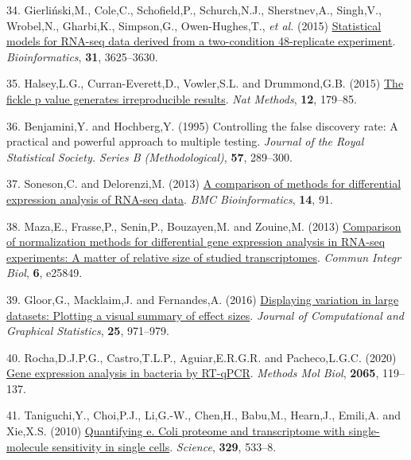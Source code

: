 \documentclass[
]{article}
\newlength{\cslhangindent}
\newenvironment{CSLReferences}[2] %
 {\begin{list}{}{%
  \setlength{\itemindent}{0pt}
  \setlength{\leftmargin}{0pt}
  \setlength{\parsep}{0pt}
  \ifodd #1
   \setlength{\leftmargin}{\cslhangindent}
   \setlength{\itemindent}{-1\cslhangindent}
  \fi
  \setlength{\itemsep}{#2\baselineskip}}}
 {\end{list}}
\begin{document}
\begin{CSLReferences}{1}{1}
34. Gierliński,M., Cole,C., Schofield,P., Schurch,N.J., Sherstnev,A.,
Singh,V., Wrobel,N., Gharbi,K., Simpson,G., Owen-Hughes,T., \emph{et
al.} (2015)
\href{https://doi.org/10.1093/bioinformatics/btv425}{Statistical models
for RNA-seq data derived from a two-condition 48-replicate experiment}.
\emph{Bioinformatics}, \textbf{31}, 3625--3630.

35. Halsey,L.G., Curran-Everett,D., Vowler,S.L. and Drummond,G.B. (2015)
\href{https://doi.org/10.1038/nmeth.3288}{The fickle p value generates
irreproducible results}. \emph{Nat Methods}, \textbf{12}, 179--85.

36. Benjamini,Y. and Hochberg,Y. (1995) Controlling the false discovery
rate: A practical and powerful approach to multiple testing.
\emph{Journal of the Royal Statistical Society. Series B
(Methodological)}, \textbf{57}, 289--300.

37. Soneson,C. and Delorenzi,M. (2013)
\href{https://doi.org/10.1186/1471-2105-14-91}{A comparison of methods
for differential expression analysis of {RNA-seq} data}. \emph{BMC
Bioinformatics}, \textbf{14}, 91.

38. Maza,E., Frasse,P., Senin,P., Bouzayen,M. and Zouine,M. (2013)
\href{https://doi.org/10.4161/cib.25849}{Comparison of normalization
methods for differential gene expression analysis in RNA-seq
experiments: A matter of relative size of studied transcriptomes}.
\emph{Commun Integr Biol}, \textbf{6}, e25849.

39. Gloor,G., Macklaim,J. and Fernandes,A. (2016)
\href{https://doi.org/10.1080/10618600.2015.1131161}{Displaying
variation in large datasets: Plotting a visual summary of effect sizes}.
\emph{Journal of Computational and Graphical Statistics}, \textbf{25},
971--979.

40. Rocha,D.J.P.G., Castro,T.L.P., Aguiar,E.R.G.R. and Pacheco,L.G.C.
(2020) \href{https://doi.org/10.1007/978-1-4939-9833-3_10}{Gene
expression analysis in bacteria by RT-qPCR}. \emph{Methods Mol Biol},
\textbf{2065}, 119--137.

41. Taniguchi,Y., Choi,P.J., Li,G.-W., Chen,H., Babu,M., Hearn,J.,
Emili,A. and Xie,X.S. (2010)
\href{https://doi.org/10.1126/science.1188308}{Quantifying e. Coli
proteome and transcriptome with single-molecule sensitivity in single
cells}. \emph{Science}, \textbf{329}, 533--8.


\end{CSLReferences}
\end{document}
